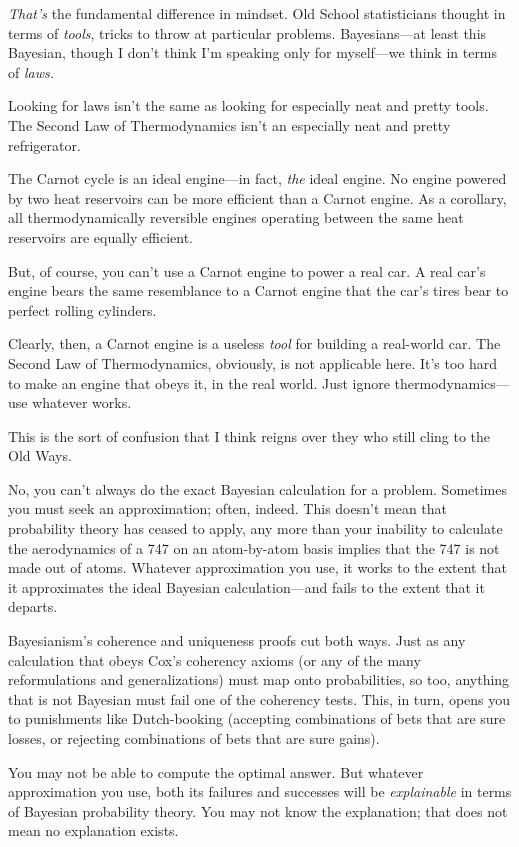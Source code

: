 {
 \textit{That's} the fundamental difference in
mindset. Old School statisticians thought in terms of \textit{tools},
tricks to throw at particular problems. Bayesians---at least this
Bayesian, though I don't think I'm
speaking only for myself---we think in terms of \textit{laws.}}

{
 Looking for laws isn't the same as looking for
especially neat and pretty tools. The Second Law of Thermodynamics
isn't an especially neat and pretty refrigerator.}

{
 The Carnot cycle is an ideal engine---in fact, \textit{the} ideal
engine. No engine powered by two heat reservoirs can be more efficient
than a Carnot engine. As a corollary, all thermodynamically reversible
engines operating between the same heat reservoirs are equally
efficient.}

{
 But, of course, you can't use a Carnot engine to
power a real car. A real car's engine bears the same
resemblance to a Carnot engine that the car's tires
bear to perfect rolling cylinders.}

{
 Clearly, then, a Carnot engine is a useless \textit{tool} for
building a real-world car. The Second Law of Thermodynamics, obviously,
is not applicable here. It's too hard to make an engine
that obeys it, in the real world. Just ignore thermodynamics---use
whatever works.}

{
 This is the sort of confusion that I think reigns over they who
still cling to the Old Ways.}

{
 No, you can't always do the exact Bayesian
calculation for a problem. Sometimes you must seek an approximation;
often, indeed. This doesn't mean that probability
theory has ceased to apply, any more than your inability to calculate
the aerodynamics of a 747 on an atom-by-atom basis implies that the 747
is not made out of atoms. Whatever approximation you use, it works to
the extent that it approximates the ideal Bayesian calculation---and
fails to the extent that it departs.}

{
 Bayesianism's coherence and uniqueness proofs cut
both ways. Just as any calculation that obeys Cox's
coherency axioms (or any of the many reformulations and
generalizations) must map onto probabilities, so too, anything that is
not Bayesian must fail one of the coherency tests. This, in turn, opens
you to punishments like Dutch-booking (accepting combinations of bets
that are sure losses, or rejecting combinations of bets that are sure
gains).}

{
 You may not be able to compute the optimal answer. But whatever
approximation you use, both its failures and successes will be
\textit{explainable} in terms of Bayesian probability theory. You may
not know the explanation; that does not mean no explanation exists.}

